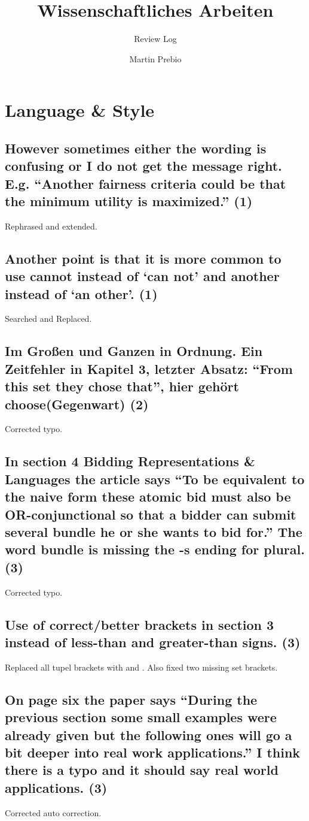 \documentclass{"../../Datenanalyse/assignments/latex-brookesassignment/brookes-assignment"}
\author{Martin Prebio}
\title{Wissenschaftliches Arbeiten}
\subtitle{Review Log}
\begin{document}
\maketitle


\section{Language \& Style}
\subsection{However sometimes either the wording is confusing or I do not get the message right. E.g. ``Another fairness criteria could be that the minimum utility is maximized.'' (1)}
Rephrased and extended.
\subsection{Another point is that it is more common to use cannot instead of `can not' and another instead of `an other'. (1)}
Searched and Replaced.
\subsection{Im Großen und Ganzen in Ordnung. Ein Zeitfehler in Kapitel 3, letzter Absatz: ``From this set they chose that'', hier gehört choose(Gegenwart) (2)}
Corrected typo.
\subsection{In section 4 Bidding Representations \& Languages the article says ``To be equivalent to the naive form these atomic bid must also be OR-conjunctional so that a bidder can submit several bundle he or she wants to bid for.'' The word bundle is missing the -s ending for plural. (3)}
Corrected typo.
\subsection{Use of correct/better brackets in section 3 instead of less-than and greater-than signs. (3)}
Replaced all tupel brackets with \langle and \rangle. Also fixed two missing set brackets.
\subsection{On page six the paper says ``During the previous section some small examples were already given but the following ones will go a bit deeper into real work applications.'' I think there is a typo and it should say real world applications. (3)}
Corrected auto correction.
\end{document}
